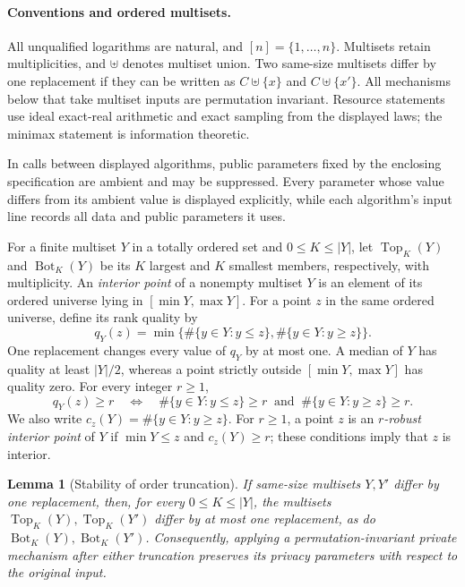 \documentclass[11pt]{article}
\newtheorem{lemma}{Lemma}[section]
\begin{document}
\paragraph{Conventions and ordered multisets.}
All unqualified logarithms are natural, and $[n]=\{1,\ldots,\allowbreak n\}$.  Multisets
retain multiplicities, and $\uplus$ denotes multiset union.  Two same-size
multisets differ by one replacement if they can be written as
$C\uplus\{x\}$ and $C\uplus\{x'\}$.  All mechanisms below that take
multiset inputs are permutation invariant.  Resource statements use ideal
exact-real arithmetic and exact sampling from the displayed laws; the
minimax statement is information theoretic.

In calls between displayed algorithms, public parameters fixed by the
enclosing specification are ambient and may be suppressed.  Every parameter
whose value differs from its ambient value is displayed explicitly, while
each algorithm's input line records all data and public parameters it uses.

For a finite multiset $Y$ in a totally ordered set and
$0\le K\le |Y|$, let $\operatorname{Top}_K(Y)$ and
$\operatorname{Bot}_K(Y)$ be its $K$ largest and $K$ smallest members,
respectively, with multiplicity.  An \emph{interior point} of a nonempty
multiset $Y$ is an element of its ordered universe lying in
$[\min Y,\max Y]$.  For a point $z$ in the same ordered universe, define
its rank quality by
\begin{equation}
 q_Y(z)=\min\bigl\{
  \#\{y\in Y:y\le z\},\#\{y\in Y:y\ge z\}
 \bigr\}.
 \label{eq:rank-quality}
\end{equation}
One replacement changes every value of $q_Y$ by at most one.  A median of
$Y$ has quality at least $|Y|/2$, whereas a point strictly outside
$[\min Y,\max Y]$ has quality zero.  For every integer $r\ge1$,
\begin{equation}
 q_Y(z)\ge r
 \quad\Longleftrightarrow\quad
 \#\{y\in Y:y\le z\}\ge r
 \ \text{ and }\
 \#\{y\in Y:y\ge z\}\ge r.
 \label{eq:rank-invariant}
\end{equation}
We also write $c_z(Y)=\#\{y\in Y:y\ge z\}$.  For $r\ge1$, a point $z$ is
an \emph{$r$-robust interior point} of $Y$ if
$\min Y\le z$ and $c_z(Y)\ge r$; these conditions imply that $z$ is
interior.

\begin{lemma}[Stability of order truncation]
\label{lem:order-truncation-stability}
If same-size multisets $Y,Y'$ differ by one replacement, then, for every
$0\le K\le|Y|$, the multisets
$\operatorname{Top}_K(Y),\operatorname{Top}_K(Y')$ differ by at most one
replacement, as do
$\operatorname{Bot}_K(Y),\operatorname{Bot}_K(Y')$.  Consequently, applying a
permutation-invariant private mechanism after either truncation preserves
its privacy parameters with respect to the original input.
\end{lemma}
\end{document}
